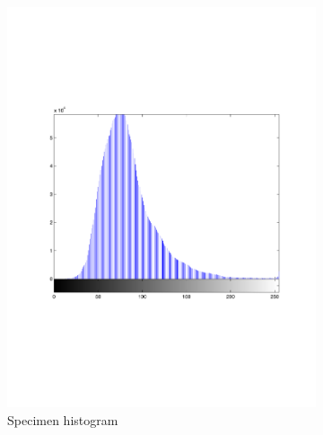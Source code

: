 \documentclass[a4paper]{article}
\begin{document}
\begin{figure}[ht]
\begin{subfigure}[b]{0.3\textwidth}
                \includegraphics[width=\textwidth]{q4-c-spechist}
                \caption{Specimen histogram}
                \label{fig:bhe3}
        \end{subfigure}%
        ~ %
        \begin{subfigure}[b]{0.3\textwidth}
                \centering

\end{subfigure}
\end{figure}
\end{document}
